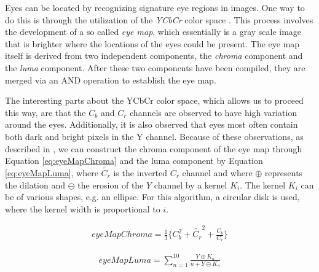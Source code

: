 Eyes can be located by recognizing signature eye regions in images. One way to do this is through the utilization of the \textit{YCbCr} color space \cite{fdInColorImages}. This process involves the development of a so called \textit{eye map}, which essentially is a gray scale image that is brighter where the locations of the eyes could be present. The eye map itself is derived from two independent components, the \textit{chroma} component and the \textit{luma} component. After these two components have been compiled, they are merged via an AND operation to establish the eye map. 

The interesting parts about the YCbCr color space, which allows us to proceed this way, are that the $C_{b}$ and $C_{r}$ channels are observed to have high variation around the eyes. Additionally, it is also observed that eyes most often contain both dark and bright pixels in the Y channel. Because of these observations, as described in \cite{fdInColorImages}, we can construct  the chroma component of the eye map through Equation \ref{eq:eyeMapChroma} and the luma component by Equation \ref{eq:eyeMapLuma}, where $\tilde{C_r}$ is the inverted $C_r$ channel and where $\oplus$ represents the dilation and $\ominus$ the erosion of the $Y$ channel by a kernel $K_{i}$. The kernel $K_{i}$ can be of various shapes, e.g. an ellipse. For this algorithm, a circular disk is used, where the kernel width is proportional to $i$.

\begin{equation} \label{eq:eyeMapChroma}
\begin{split}
eyeMapChroma = \frac{1}{3} \lbrace C_b^2 + \tilde{C_r}^2 + \frac{C_b}{C_r} \rbrace
\end{split}
\end{equation}


\begin{equation} \label{eq:eyeMapLuma}
\begin{split}
  eyeMapLuma = \sum_{n=1}^{10}\frac{Y\oplus K_{n}}{n + Y\ominus  K_{n}}
\end{split}
\end{equation}






